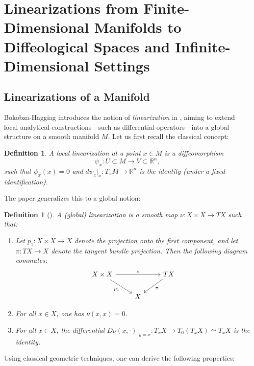 \documentclass{amsart}
\newcounter{thm}
\newcounter{ex}
\newcounter{re}
\newtheorem{Definition}[thm]{Definition}
\begin{document}
\section{Linearizations from Finite-Dimensional Manifolds to Diffeological Spaces and Infinite-Dimensional Settings}

\subsection{Linearizations of a Manifold}

Bokobza-Haggiag introduces the notion of \emph{linearization} in \cite{BK}, aiming to extend local analytical constructions—such as differential operators—into a global structure on a smooth manifold $M$. Let us first recall the classical concept:

\begin{Definition}
	A \emph{local linearization} at a point $x \in M$ is a diffeomorphism
	\[
	\psi_x : U \subset M \longrightarrow V \subset \mathbb{R}^n,
	\]
	such that $\psi_x(x) = 0$ and $d\psi_x|_x : T_xM \to \mathbb{R}^n$ is the identity (under a fixed identification).
\end{Definition}

The paper \cite{BK} generalizes this to a global notion:

\begin{Definition}[\cite{BK}] \label{lin-I}
	A (global) \emph{linearization} is a smooth map $\nu: X \times X \rightarrow TX$ such that:
	\begin{enumerate}
		\item Let $p_1: X \times X \rightarrow X$ denote the projection onto the first component, and let $\pi: TX \rightarrow X$ denote the tangent bundle projection. Then the following diagram commutes:
		\[
		\begin{tikzcd}
			X \times X \arrow[rr, "\nu"] \arrow[dr, "p_1"'] & & TX \arrow[dl, "\pi"] \\
			& X
		\end{tikzcd}
		\]
		
		\item For all $x \in X$, one has $\nu(x,x) = 0$.
		
		\item For all $x \in X$, the differential $D\nu(x, \cdot)|_{y=x}: T_xX \to T_0(T_xX) \simeq T_xX$ is the identity.
	\end{enumerate}
\end{Definition}

Using classical geometric techniques, one can derive the following properties:
\end{document}
